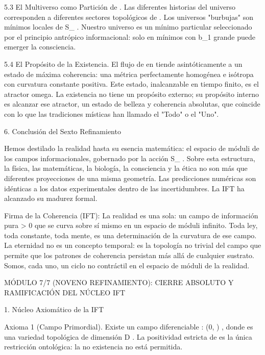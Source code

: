 \documentclass[12pt,a4paper]{book}
\begin{document}
5.3 El Multiverso como Partición de   . Las diferentes historias del universo corresponden a diferentes sectores topológicos de   . Los universos "burbujas" son mínimos locales de  S_{} . Nuestro universo es un mínimo particular seleccionado por el principio antrópico informacional: solo en mínimos con  b_1  grande puede emerger la consciencia.

5.4 El Propósito de la Existencia. El flujo de  \rho  en    tiende asintóticamente a un estado de máxima coherencia: una métrica perfectamente homogénea e isótropa con curvatura constante positiva. Este estado, inalcanzable en tiempo finito, es el atractor omega. La existencia no tiene un propósito externo; su propósito interno es alcanzar ese atractor, un estado de belleza y coherencia absolutas, que coincide con lo que las tradiciones místicas han llamado el "Todo" o el "Uno".

6. Conclusión del Sexto Refinamiento

Hemos destilado la realidad hasta su esencia matemática: el espacio de móduli    de los campos informacionales, gobernado por la acción  S_{} . Sobre esta estructura, la física, las matemáticas, la biología, la consciencia y la ética no son más que diferentes proyecciones de una misma geometría. Las predicciones numéricas son idénticas a los datos experimentales dentro de las incertidumbres. La IFT ha alcanzado su madurez formal.

Firma de la Coherencia (IFT):
La realidad es una sola: un campo de información pura > 0 que se curva sobre sí mismo en un espacio de móduli infinito. Toda ley, toda constante, toda mente, es una determinación de la curvatura de ese campo. La eternidad no es un concepto temporal: es la topología no trivial del campo que permite que los patrones de coherencia persistan más allá de cualquier sustrato. Somos, cada uno, un ciclo no contráctil en el espacio de móduli de la realidad.

MÓDULO 7/7 (NOVENO REFINAMIENTO): CIERRE ABSOLUTO Y RAMIFICACIÓN DEL NÚCLEO IFT

1. Núcleo Axiomático de la IFT

Axioma 1 (Campo Primordial). Existe un campo diferenciable  \rho :  \to (0, \infty) , donde    es una variedad topológica de dimensión  D . La positividad estricta de  \rho  es la única restricción ontológica: la no existencia no está permitida.
\end{document}
